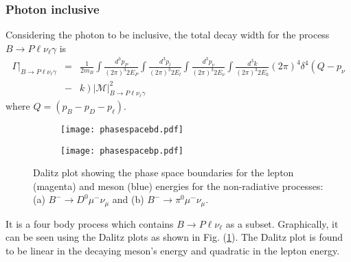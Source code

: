 \documentclass[a4paper,11pt]{article}
\begin{document}
	\subsubsection{Photon inclusive}
	 Considering the photon to be inclusive, the total decay width for the process $B\rightarrow P \ell \nu_\ell \gamma $ is
 \begin{eqnarray}
	   \Gamma|_{B\to P \ell \nu_{\ell} \gamma}&=&\frac{1}{2 m_{B}}\int \frac{d^{3}p_{P}}{(2\pi)^{3} 2 E_{P}}\int \frac{d^{3}p_{l}}{(2\pi)^{3} 2 E_{l}}\int \frac{d^{3}p_{\nu}}{(2\pi)^{3} 2E_{\nu}}\int \frac{d^{3}k}{(2\pi)^{3} 2E_{k}}(2\pi)^{4} \delta^{4}\left(Q - p_{\nu}\nonumber\right.\\&-& \left. k \right) \left|\mathcal{M}\right|_{B\to P \ell \nu_{\ell} \gamma}^{2}
	   \label{eqngamma}
	   \end{eqnarray}
	   where $Q=(p_B-p_D-p_\ell)$.\\
	   \begin{figure}[h]
	   	\begin{subfigure}{.5\textwidth}
	   		\centering
	   		\texttt{[image: phasespacebd.pdf]}
	   		\caption{}
	   	\end{subfigure}%
	   	\begin{subfigure}{.5\textwidth}
	   		\centering
	   		\texttt{[image: phasespacebp.pdf]}
	   		\caption{}
	   	\end{subfigure}
   	\caption{Dalitz plot showing the phase space boundaries for the lepton (magenta) and meson (blue) energies for the non-radiative processes: (a) $B^- \rightarrow D^0 \mu^- \nu_\mu$ and (b) $B^- \rightarrow \pi^0 \mu^- \nu_\mu$. }
   	\label{fig3}
	   \end{figure} 
	   It is a four body process which contains $B\rightarrow P \ell \nu_\ell$ as a subset. Graphically, it can be seen using the Dalitz plots as shown in Fig. (\ref{fig3}).  The Dalitz plot is found to be linear in the decaying meson's energy and quadratic in the lepton energy.
\end{document}
